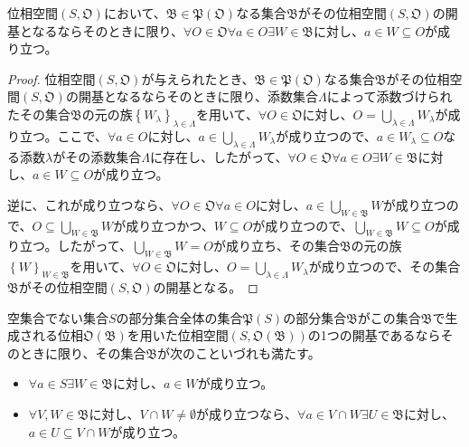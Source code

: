\documentclass[dvipdfmx]{jsarticle}
\begin{document}
\begin{thm}\label{8.1.2.8}
位相空間$\left( S,\mathfrak{O} \right)$において、$\mathfrak{B \in P}\left( \mathfrak{O} \right)$なる集合$\mathfrak{B}$がその位相空間$\left( S,\mathfrak{O} \right)$の開基となるならそのときに限り、$\forall O \in \mathfrak{O\forall}a \in O\exists W \in \mathfrak{B}$に対し、$a \in W \subseteq O$が成り立つ。
\end{thm}
\begin{proof}
位相空間$\left( S,\mathfrak{O} \right)$が与えられたとき、$\mathfrak{B \in P}\left( \mathfrak{O} \right)$なる集合$\mathfrak{B}$がその位相空間$\left( S,\mathfrak{O} \right)$の開基となるならそのときに限り、添数集合$\varLambda$によって添数づけられたその集合$\mathfrak{B}$の元の族$\left\{ W_{\lambda} \right\}_{\lambda \in \varLambda}$を用いて、$\forall O \in \mathfrak{O}$に対し、$O = \bigcup_{\lambda \in \varLambda} W_{\lambda}$が成り立つ。ここで、$\forall a \in O$に対し、$a \in \bigcup_{\lambda \in \varLambda} W_{\lambda}$が成り立つので、$a \in W_{\lambda} \subseteq O$なる添数$\lambda$がその添数集合$\varLambda$に存在し、したがって、$\forall O \in \mathfrak{O\forall}a \in O\exists W \in \mathfrak{B}$に対し、$a \in W \subseteq O$が成り立つ。\par
逆に、これが成り立つなら、$\forall O \in \mathfrak{O\forall}a \in O$に対し、$a \in \bigcup_{W \in \mathfrak{B}} W$が成り立つので、$O \subseteq \bigcup_{W \in \mathfrak{B}} W$が成り立つかつ、$W \subseteq O$が成り立つので、$\bigcup_{W \in \mathfrak{B}} W \subseteq O$が成り立つ。したがって、$\bigcup_{W \in \mathfrak{B}} W = O$が成り立ち、その集合$\mathfrak{B}$の元の族$\left\{ W \right\}_{W \in \mathfrak{B}}$を用いて、$\forall O \in \mathfrak{O}$に対し、$O = \bigcup_{\lambda \in \varLambda} W_{\lambda}$が成り立つので、その集合$\mathfrak{B}$がその位相空間$(S,\mathfrak{O})$の開基となる。
\end{proof}
\begin{thm}\label{8.1.2.9}
空集合でない集合$S$の部分集合全体の集合$\mathfrak{P}(S)$の部分集合$\mathfrak{B}$がこの集合$\mathfrak{B}$で生成される位相$\mathfrak{O}\left( \mathfrak{B} \right)$を用いた位相空間$\left( S,\mathfrak{O}\left( \mathfrak{B} \right) \right)$の1つの開基であるならそのときに限り、その集合$\mathfrak{B}$が次のこといづれも満たす。
\begin{itemize}
\item
  $\forall a \in S\exists W \in \mathfrak{B}$に対し、$a \in W$が成り立つ。
\item
  $\forall V,W \in \mathfrak{B}$に対し、$V \cap W \neq \emptyset$が成り立つなら、$\forall a \in V \cap W\exists U \in \mathfrak{B}$に対し、$a \in U \subseteq V \cap W$が成り立つ。
\end{itemize}
\end{thm}
\end{document}

